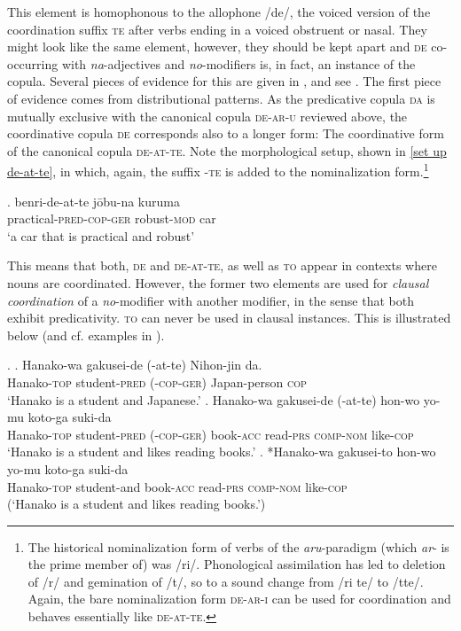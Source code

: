 \documentclass [output=book,colorlinks,citecolor=brown]{langscibook}
\begin{document}
This element is homophonous to the allophone /de/, the voiced version of the coordination suffix \textsc{te} after verbs ending in a voiced obstruent or nasal. They might look like the same element, however, they should be kept apart and \textsc{de} co-occurring with \textit{na}-adjectives and \textit{no}-modifiers is, in fact, an instance of the copula. Several pieces of evidence for this are given in \citet{hiraiwa:2012:mechanism}, and see \citet{bloch:1970:bloch}. The first piece of evidence comes from distributional patterns. As the predicative copula \textsc{da} is mutually exclusive with the canonical copula \textsc{de-ar-u} reviewed above, the coordinative copula \textsc{de} corresponds also to a longer form: The coordinative form of the canonical copula \textsc{de-at-te}. Note the morphological setup, shown in \ref{set up de-at-te}, in which, again, the suffix -\textsc{te} is added to the nominalization form.\footnote{The historical nominalization form of verbs of the \textit{aru}-paradigm (which \textit{ar}- is the prime member of) was /ri/. Phonological assimilation has led to deletion of /r/ and gemination of /t/, so to a sound change from /ri te/ to /tte/. Again, the bare nominalization form \textsc{de-ar-i} can be used for coordination and behaves essentially like \textsc{de-at-te}.} %


\exg. benri-de-at-te jōbu-na kuruma\\
practical-\textsc{pred-cop-ger} robust-\textsc{mod} car\\
`a car that is practical and robust' \label{set up de-at-te}

This means that both, \textsc{de} and \textsc{de-at-te}, as well as \textsc{to} appear in contexts where nouns are coordinated. However, the former two elements are used for \textit{clausal coordination} of a \textit{no}-modifier with another modifier, in the sense that both exhibit predicativity. \textsc{to} can never be used in clausal instances. This is illustrated below (and cf. examples in \citealt[363]{hiraiwa:2012:mechanism}). %

\ex. \ag. Hanako-wa gakusei-de (-at-te) Nihon-jin da.\\
Hanako-\textsc{top} student-\textsc{pred} (-\textsc{cop}-\textsc{ger}) Japan-person \textsc{cop}\\
`Hanako is a student and Japanese.’
\bg. Hanako-wa gakusei-de (-at-te) hon-wo yo-mu koto-ga suki-da\\
Hanako-\textsc{top} student-\textsc{pred} (-\textsc{cop}-\textsc{ger}) book-\textsc{acc} read-\textsc{prs} \textsc{comp-nom} like-\textsc{cop}\\
`Hanako is a student and likes reading books.’
\cg. *Hanako-wa gakusei-to hon-wo yo-mu koto-ga suki-da\\
Hanako-\textsc{top} student-and book-\textsc{acc} read-\textsc{prs} \textsc{comp-nom} like-\textsc{cop}\\
(`Hanako is a student and likes reading books.’)
\end{document}
